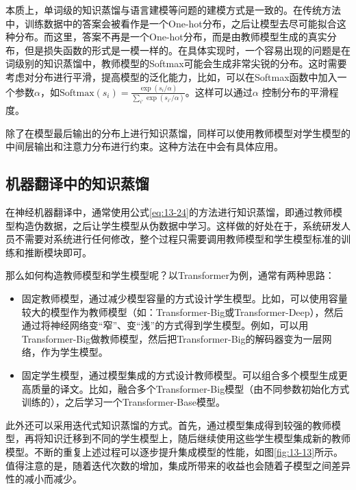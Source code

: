 \parinterval 本质上，单词级的知识蒸馏与语言建模等问题的建模方式是一致的。在传统方法中，训练数据中的答案会被看作是一个One-hot分布，之后让模型去尽可能拟合这种分布。而这里，答案不再是一个One-hot分布，而是由教师模型生成的真实分布，但是损失函数的形式是一模一样的。在具体实现时，一个容易出现的问题是在词级别的知识蒸馏中，教师模型的Softmax可能会生成非常尖锐的分布。这时需要考虑对分布进行平滑，提高模型的泛化能力，比如，可以在Softmax函数中加入一个参数$\alpha$，如$\textrm{Softmax}(s_i)=\frac{\exp(s_i/\alpha)}{\sum_{i'} \exp(s_{i'}/\alpha)}$。这样可以通过$\alpha$ 控制分布的平滑程度。

\parinterval 除了在模型最后输出的分布上进行知识蒸馏，同样可以使用教师模型对学生模型的中间层输出和注意力分布进行约束。这种方法在{\chapterfourteen}中会有具体应用。


\subsection{机器翻译中的知识蒸馏}

\parinterval 在神经机器翻译中，通常使用公式\eqref{eq:13-24}的方法进行知识蒸馏，即通过教师模型构造伪数据，之后让学生模型从伪数据中学习。这样做的好处在于，系统研发人员不需要对系统进行任何修改，整个过程只需要调用教师模型和学生模型标准的训练和推断模块即可。

\parinterval 那么如何构造教师模型和学生模型呢？以Transformer为例，通常有两种思路：

\begin{itemize}
\vspace{0.5em}
\item 固定教师模型，通过减少模型容量的方式设计学生模型。比如，可以使用容量较大的模型作为教师模型（如：Transformer-Big或Transformer-Deep），然后通过将神经网络变“窄”、变“浅”的方式得到学生模型。例如，可以用Transformer-Big做教师模型，然后把Transformer-Big的解码器变为一层网络，作为学生模型。
\vspace{0.5em}
\item 固定学生模型，通过模型集成的方式设计教师模型。可以组合多个模型生成更高质量的译文。比如，融合多个Transformer-Big模型（由不同参数初始化方式训练的），之后学习一个Transformer-Base模型。
\vspace{0.5em}
\end{itemize}

\parinterval 此外还可以采用迭代式知识蒸馏的方式。首先，通过模型集成得到较强的教师模型，再将知识迁移到不同的学生模型上，随后继续使用这些学生模型集成新的教师模型。不断的重复上述过程可以逐步提升集成模型的性能，如图\ref{fig:13-13}所示。值得注意的是，随着迭代次数的增加，集成所带来的收益也会随着子模型之间差异性的减小而减少。

